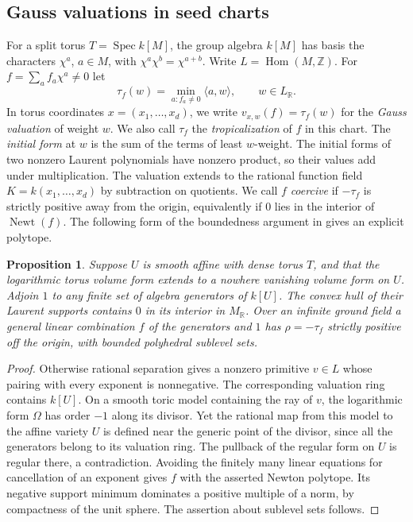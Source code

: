 \documentclass[11pt,reqno]{amsart}
\numberwithin{equation}{section}
\newtheorem{proposition}[theorem]{Proposition}
\theoremstyle{definition}
\theoremstyle{remark}
\DeclareMathOperator{\Newt}{Newt}
\DeclareMathOperator{\Spec}{Spec}
\begin{document}
\subsection{Gauss valuations in seed charts}

For a split torus \(T=\Spec k[M]\), the group algebra \(k[M]\)
has basis the characters \(\chi^a\), \(a\in M\), with
\(\chi^a\chi^b=\chi^{a+b}\). Write \(L=\operatorname{Hom}(M,\mathbb Z)\).
For \(f=\sum_a f_a\chi^a\ne0\) let
\[ \tau_f(w)=\min_{a:f_a\ne0}\langle a,w\rangle,\qquad w\in L_{\mathbb R}. \]
In torus coordinates \(x=(x_1,\ldots,x_d)\), we write
\(v_{x,w}(f)=\tau_f(w)\) for the \emph{Gauss valuation} of weight \(w\).
We also call \(\tau_f\) the \emph{tropicalization} of \(f\) in this
chart. The \emph{initial form} at \(w\) is the sum of the terms of
least \(w\)-weight. The initial forms of two nonzero Laurent polynomials have nonzero product,
so their values add under multiplication. The valuation extends to the
rational function field \(K=k(x_1,\ldots,x_d)\) by subtraction on quotients.
We call \(f\) \emph{coercive} if \(-\tau_f\) is strictly positive away
from the origin, equivalently if \(0\) lies in the interior of \(\Newt(f)\).
The following form of the boundedness argument in \cite[Lemma~2.9
and Corollary~15.11]{KY} gives an explicit polytope.

\begin{proposition}\label{prop:coercive}
Suppose \(U\) is smooth affine with dense torus \(T\), and that
the logarithmic torus volume form extends to a nowhere vanishing
volume form on \(U\). Adjoin \(1\) to any finite set of algebra
generators of \(k[U]\). The convex hull of their Laurent supports
contains \(0\) in its interior in \(M_{\mathbb R}\). Over an infinite
ground field a general linear combination \(f\) of the generators and \(1\) has
\(\rho=-\tau_f\) strictly positive off the origin, with bounded
polyhedral sublevel sets.
\end{proposition}
\begin{proof}
Otherwise rational separation gives a nonzero primitive \(v\in L\)
whose pairing with every exponent is nonnegative. The corresponding valuation ring contains \(k[U]\).
On a smooth toric model containing the ray of \(v\), the logarithmic
form \(\Omega\) has order \(-1\) along its divisor. Yet the rational
map from this model to the affine variety \(U\) is defined near the
generic point of the divisor, since all the generators belong to its
valuation ring. The pullback of the regular form on \(U\) is regular
there, a contradiction. Avoiding the finitely many linear equations for
cancellation of an exponent gives \(f\) with the asserted Newton
polytope. Its negative support minimum dominates a positive multiple
of a norm, by compactness of the unit sphere. The assertion about
sublevel sets follows.
\end{proof}
\end{document}
